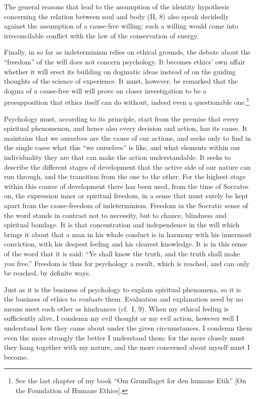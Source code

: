 \documentclass[12pt,a4paper]{book}
\newcommand{\opage}[1]{\marginnote{\footnotesize\textit{[#1]}}}
\begin{document}
The general reasons that lead to the assumption of the identity
hypothesis concerning the relation between soul and body (II, 8) also
speak decidedly against the assumption of a cause-free willing: such a
willing would come into irreconcilable conflict with the law of the
conservation of energy.

Finally, in so far as indeterminism relies on ethical grounds, the debate
about the ``freedom'' of the will does not concern psychology. It becomes
ethics' own affair whether it will erect its building on dogmatic ideas
instead of on the guiding thoughts of the science of experience. It must,
however, be remarked that the dogma of a cause-free will will prove on
closer investigation to be a presupposition that ethics itself can do
without, indeed even a
questionable one.\footnote{See the last chapter of my book ``Om
Grundlaget for den humane Etik'' [On the Foundation of Humane Ethics].}

Psychology must, according to its principle, start from the premise that
every spiritual phenomenon, and hence also every decision and action, has
its cause. It maintains that we ourselves are the cause of our actions, and
seeks only to find in the single cases what this ``we ourselves'' is like,
and what elements within our individuality they are that can make the
action understandable. It seeks to describe the different stages of
development that the active side of our nature can run through, and the
transition from the one to the other. For the highest stage within this
course of development there has been used, from the time of Socrates
\opage{404}on, the expression inner or spiritual freedom, in a sense
that must surely be kept apart from the cause-freedom of indeterminism.
Freedom in the Socratic sense of the word stands in contrast not to
necessity, but to chance, blindness and spiritual bondage. It is that
concentration and independence in the will which brings it about that a
man in his whole conduct is in harmony with his innermost conviction, with
his deepest feeling and his clearest knowledge. It is in this sense of the
word that it is said: ``Ye shall know the truth, and the truth shall make
you free.'' Freedom is thus for psychology a result, which is reached,
and can only be reached, by definite ways.

Just as it is the business of psychology to explain spiritual phenomena,
so it is the business of ethics to \emph{evaluate} them. Evaluation and
explanation need by no means meet each other as hindrances (cf.\ I, 9).
When my ethical feeling is sufficiently alive, I condemn my evil thought
or my evil action, however well I understand how they came about under the
given circumstances. I condemn them even the more strongly the better I
understand them: for the more closely must they hang together with my
nature, and the more concerned about myself must I become.
\end{document}
